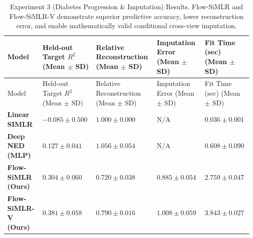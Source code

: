 \documentclass[
  letterpaper,
]{report}
\begin{document}
\begin{longtable}[]{@{}
  >{\raggedright\arraybackslash}p{}
  >{\centering\arraybackslash}p{}
  >{\centering\arraybackslash}p{}
  >{\centering\arraybackslash}p{}
  >{\centering\arraybackslash}p{}@{}}
\caption{Experiment 3 (Diabetes Progression \& Imputation) Results.
Flow-SiMLR and Flow-SiMLR-V demonstrate superior predictive accuracy,
lower reconstruction error, and enable mathematically valid conditional
cross-view imputation.}\label{tbl-exp3-results}\tabularnewline
\toprule\noalign{}
\begin{minipage}[b]{\linewidth}\raggedright
Model
\end{minipage} & \begin{minipage}[b]{\linewidth}\centering
Held-out Target \(R^2\) (Mean \(\pm\) SD)
\end{minipage} & \begin{minipage}[b]{\linewidth}\centering
Relative Reconstruction (Mean \(\pm\) SD)
\end{minipage} & \begin{minipage}[b]{\linewidth}\centering
Imputation Error (Mean \(\pm\) SD)
\end{minipage} & \begin{minipage}[b]{\linewidth}\centering
Fit Time (sec) (Mean \(\pm\) SD)
\end{minipage} \\
\midrule\noalign{}
\endfirsthead
\toprule\noalign{}
\begin{minipage}[b]{\linewidth}\raggedright
Model
\end{minipage} & \begin{minipage}[b]{\linewidth}\centering
Held-out Target \(R^2\) (Mean \(\pm\) SD)
\end{minipage} & \begin{minipage}[b]{\linewidth}\centering
Relative Reconstruction (Mean \(\pm\) SD)
\end{minipage} & \begin{minipage}[b]{\linewidth}\centering
Imputation Error (Mean \(\pm\) SD)
\end{minipage} & \begin{minipage}[b]{\linewidth}\centering
Fit Time (sec) (Mean \(\pm\) SD)
\end{minipage} \\
\midrule\noalign{}
\endhead
\bottomrule\noalign{}
\endlastfoot
\textbf{Linear SIMLR} & \(-0.085 \pm 0.500\) & \(1.000 \pm 0.000\) & N/A
& \(0.036 \pm 0.001\) \\
\textbf{Deep NED (MLP)} & \(0.127 \pm 0.041\) & \(1.056 \pm 0.054\) &
N/A & \(0.608 \pm 0.090\) \\
\textbf{Flow-SiMLR (Ours)} & \(0.304 \pm 0.060\) &
\(\mathbf{0.720 \pm 0.038}\) & \(\mathbf{0.885 \pm 0.054}\) &
\(\mathbf{2.759 \pm 0.047}\) \\
\textbf{Flow-SiMLR-V (Ours)} & \(\mathbf{0.381 \pm 0.058}\) &
\(0.790 \pm 0.016\) & \(1.008 \pm 0.059\) & \(3.843 \pm 0.027\) \\
\end{longtable}
\end{document}
